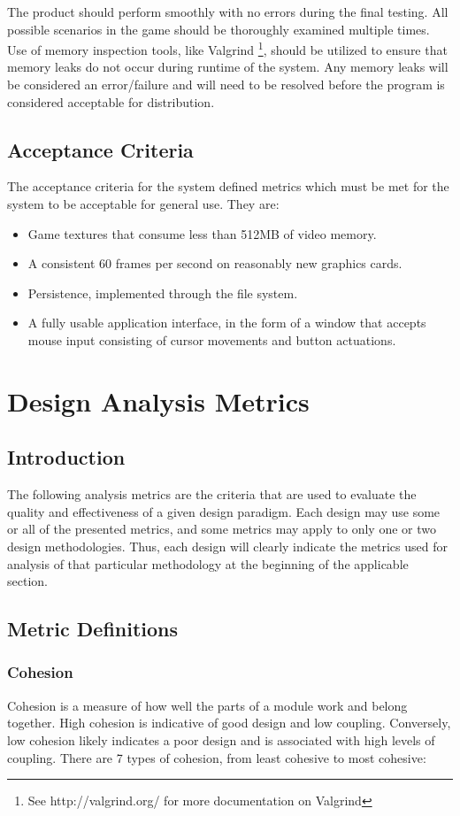 \documentclass{article}
\begin{document}
    The product should perform smoothly with no errors during the final testing. All possible scenarios in the game should be thoroughly examined multiple times. Use of memory inspection tools, like Valgrind \footnote{See http://valgrind.org/ for more documentation on Valgrind}, should be utilized to ensure that memory leaks do not occur during runtime of the system. Any memory leaks will be considered an error/failure and will need to be resolved before the program is considered acceptable for distribution.
	\subsection{Acceptance Criteria}
		The acceptance criteria for the system defined metrics which must be met for the system to be acceptable for general use. They are:
		\begin{itemize}
			\item Game textures that consume less than 512MB of video memory.
      \item A consistent 60 frames per second on reasonably new graphics cards.
			\item Persistence, implemented through the file system. 
			\item A fully usable application interface, in the form of a window that accepts mouse input consisting of cursor movements and button actuations.
		\end{itemize}
%
%
\section{Design Analysis Metrics}
	\subsection{Introduction}
		The following analysis metrics are the criteria that are used to evaluate the quality and effectiveness of a given design paradigm. Each design may use some or all of the presented metrics, and some metrics may apply to only one or two design methodologies. Thus, each design will clearly indicate the metrics used for analysis of that particular methodology at the beginning of the applicable section. 
	\subsection{Metric Definitions}
		\subsubsection{Cohesion}
			Cohesion is a measure of how well the parts of a module work and belong together. High cohesion is indicative of good design and low coupling. Conversely, low cohesion likely indicates a poor design and is associated with high levels of coupling. There are 7 types of cohesion, from least cohesive to most cohesive:
\end{document}
